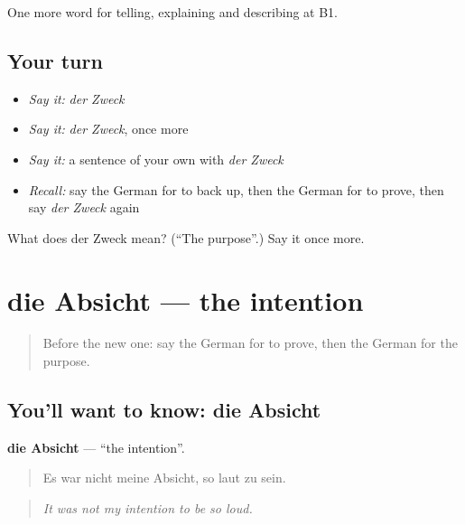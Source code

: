 \begin{grammarlens}[title={What you've built}]
One more word for telling, explaining and describing at B1.
\end{grammarlens}

\subsection*{Your turn}
\begin{itemize}
\raggedright
  \item \emph{Say it:} \emph{der Zweck}
  \item \emph{Say it:} \emph{der Zweck}, once more
  \item \emph{Say it:} a sentence of your own with \emph{der Zweck}
  \item \emph{Recall:} say the German for to back up, then the German for to prove, then say \emph{der Zweck} again
\end{itemize}

\begin{tcolorbox}[breakable,colback=teal!4,colframe=teal!35!black,title={Before you move on}]
What does der Zweck mean? (\textquotedblleft{}The purpose\textquotedblright{}.) Say it once more.
\end{tcolorbox}
\section[die Absicht]{die Absicht — the intention}

\label{lesson:GE-C346-absicht}



\begin{quote}
Before the new one: say the German for to prove, then the German for the purpose.
\end{quote}

\subsection*{You'll want to know: die Absicht}
\textbf{die Absicht} — \textquotedblleft{}the intention\textquotedblright{}.

\begin{quote}
Es war nicht meine Absicht, so laut zu sein.
\end{quote}

\begin{quote}
\emph{It was not my intention to be so loud.}
\end{quote}

